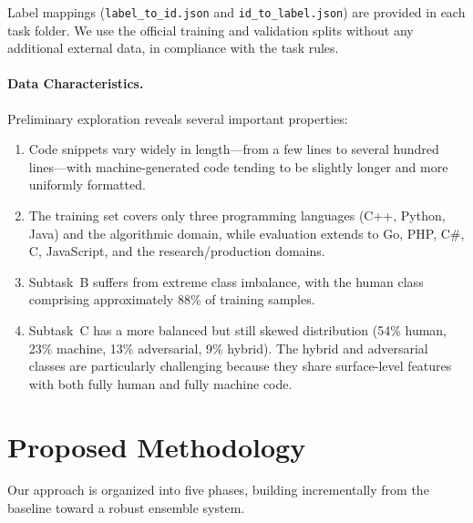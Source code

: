 \documentclass[11pt]{article}
\begin{document}
Label mappings (\texttt{label\_to\_id.json} and \texttt{id\_to\_label.json}) are provided in each task folder. We use the official training and validation splits without any additional external data, in compliance with the task rules.

\paragraph{Data Characteristics.} Preliminary exploration reveals several important properties:
\begin{enumerate}
    \item Code snippets vary widely in length---from a few lines to several hundred lines---with machine-generated code tending to be slightly longer and more uniformly formatted.
    \item The training set covers only three programming languages (C++, Python, Java) and the algorithmic domain, while evaluation extends to Go, PHP, C\#, C, JavaScript, and the research/production domains.
    \item Subtask~B suffers from extreme class imbalance, with the human class comprising approximately 88\% of training samples.
    \item Subtask~C has a more balanced but still skewed distribution (54\% human, 23\% machine, 13\% adversarial, 9\% hybrid). The hybrid and adversarial classes are particularly challenging because they share surface-level features with both fully human and fully machine code.
\end{enumerate}

\section{Proposed Methodology}
\label{sec:method}

Our approach is organized into five phases, building incrementally from the baseline toward a robust ensemble system.

\end{document}
